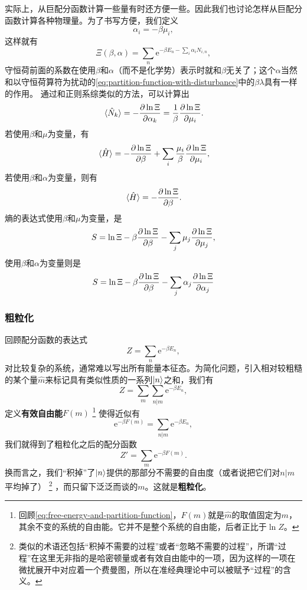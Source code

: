 \documentclass[hyperref, UTF8, a4paper]{ctexart}
\newcommand*{\ee}{\mathrm{e}}
\begin{document}
实际上，从巨配分函数计算一些量有时还方便一些。因此我们也讨论怎样从巨配分函数计算各种物理量。为了书写方便，我们定义
\begin{equation}
    \alpha_i = - \beta \mu_i,
\end{equation}
这样就有
\begin{equation}
    \Xi(\beta, \alpha) = \sum_n \ee^{-\beta E_n - \sum_i \alpha_i N_{i,n}},
\end{equation}
守恒荷前面的系数在使用$\beta$和$\alpha$（而不是化学势）表示时就和$\beta$无关了；这个$\alpha$当然和以守恒荷算符为扰动的\eqref{eq:partition-function-with-disturbance}中的$\beta\lambda$具有一样的作用。
通过和正则系综类似的方法，可以计算出
\begin{equation}
    \expval*{\hat{N}_k} = - \pdv{\ln \Xi}{\alpha_k} = \frac{1}{\beta} \pdv{\ln \Xi}{\mu_i}.
    \label{eq:expectation-of-charge-grand}
\end{equation}
若使用$\beta$和$\mu$为变量，有
\begin{equation}
    \expval*{\hat{H}} = - \pdv{\ln \Xi}{\beta} + \sum_i \frac{\mu_i}{\beta} \pdv{\ln \Xi}{\mu_i},
\end{equation}
若使用$\beta$和$\alpha$为变量，则有
\begin{equation}
    \expval*{\hat{H}} = - \pdv{\ln \Xi}{\beta}.
    \label{eq:expactation-of-energy-grand}
\end{equation}
熵的表达式使用$\beta$和$\mu$为变量，是
\begin{equation}
    S = \ln \Xi - \beta \pdv{\ln \Xi}{\beta} - \sum_j \mu_j \pdv{\ln \Xi}{\mu_j},
    \label{eq:entropy-mu-beta}
\end{equation}
使用$\beta$和$\alpha$为变量则是
\begin{equation}
    S = \ln \Xi - \beta \pdv{\ln \Xi}{\beta} - \sum_j \alpha_j \pdv{\ln \Xi}{\alpha_j}
\end{equation}

\subsubsection{粗粒化}\label{sec:coarse-graining}


回顾配分函数的表达式
\[
    Z = \sum_n \ee^{- \beta E_n},
\]
对比较复杂的系统，通常难以写出所有能量本征态。为简化问题，引入相对较粗糙的某个量$\hat{m}$来标记具有类似性质的一系列$\ket{n}$之和，我们有
\[
    Z = \sum_m \sum_{n|m} \ee^{- \beta E_n},
\]
定义\textbf{有效自由能}$F(m)$%
\footnote{回顾\eqref{eq:free-energy-and-partition-function}，$F(m)$就是$\hat{m}$的取值固定为$m$，其余不变的系统的自由能。它并不是整个系统的自由能，后者正比于$\ln Z$。
}%
使得近似有
\[
    \ee^{- \beta F(m)} = \sum_{n|m} \ee^{- \beta E_n},
\]
我们就得到了粗粒化之后的配分函数
\[
    Z' = \sum_m \ee^{- \beta F(m)}.
\]
换而言之，我们“积掉”了$\ket{n}$提供的那部分不需要的自由度（或者说把它们对$n|m$平均掉了）%
\footnote{类似的术语还包括“积掉不需要的过程”或者“忽略不需要的过程”，所谓“过程”在这里无非指的是哈密顿量或者有效自由能中的一项，因为这样的一项在微扰展开中对应着一个费曼图，所以在准经典理论中可以被赋予“过程”的含义。}%
，而只留下泛泛而谈的$m$。这就是\textbf{粗粒化}。
\end{document}
